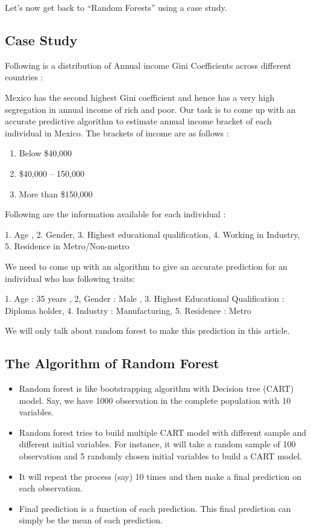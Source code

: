 \documentclass[a4paper,12pt]{article}
\begin{document}
Let’s now get back to “Random Forests” using a case study.


\subsection*{Case Study}
Following is a distribution of Annual income Gini Coefficients across different countries :


Mexico has the second highest Gini coefficient and hence has a very high segregation in annual income of rich and poor. Our task is to come up with an accurate predictive algorithm to estimate annual income bracket of each individual in Mexico. The brackets of income are as follows :

\begin{enumerate}
	\item Below \$40,000
	
	\item \$40,000 – 150,000
	
	\item More than \$150,000
\end{enumerate}


Following are the information available for each individual :

1. Age , 2. Gender,  3. Highest educational qualification, 4. Working in Industry, 5. Residence in Metro/Non-metro

We need to come up with an algorithm to give an accurate prediction for an individual who has following traits:

1. Age : 35 years , 2, Gender : Male , 3. Highest Educational Qualification : Diploma holder, 4. Industry : Manufacturing, 5. Residence : Metro

We will only talk about random forest to make this prediction in this article.




\subsection*{The Algorithm of Random Forest}

\begin{itemize}
	\item Random forest is like bootstrapping algorithm with Decision tree (CART) model. Say, we have 1000 observation in the complete population with 10 variables.
	\item  Random forest tries to build multiple CART model with different sample and different initial variables. For instance, it will take a random sample of 100 observation and 5 randomly chosen initial variables to build a CART model.
	\item It will repeat the process (say) 10 times and then make a final prediction on each observation. 
	\item Final prediction is a function of each prediction. This final prediction can simply be the mean of each prediction.
	 
\end{itemize}
\end{document}
